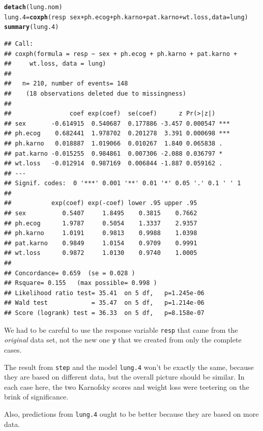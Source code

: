 \documentclass{article}\usepackage[]{graphicx}\usepackage[]{color}
\makeatletter
\newcommand{\hlopt}[1]{\textcolor[rgb]{0,0,0}{#1}}%
\newcommand{\hlstd}[1]{\textcolor[rgb]{0.345,0.345,0.345}{#1}}%
\newcommand{\hlkwb}[1]{\textcolor[rgb]{0.69,0.353,0.396}{#1}}%
\newcommand{\hlkwc}[1]{\textcolor[rgb]{0.333,0.667,0.333}{#1}}%
\newcommand{\hlkwd}[1]{\textcolor[rgb]{0.737,0.353,0.396}{\textbf{#1}}}%
\newenvironment{kframe}{%
 \def\at@end@of@kframe{}%
 \ifinner\ifhmode%
  \def\at@end@of@kframe{\end{minipage}}%
  \begin{minipage}{\columnwidth}%
 \fi\fi%
 \def\FrameCommand##1{\hskip\@totalleftmargin \hskip-\fboxsep
 \colorbox{shadecolor}{##1}\hskip-\fboxsep
     \hskip-\linewidth \hskip-\@totalleftmargin \hskip\columnwidth}%
 \MakeFramed {\advance\hsize-\width
   \@totalleftmargin\z@ \linewidth\hsize
   \@setminipage}}%
 {\par\unskip\endMakeFramed%
 \at@end@of@kframe}
\newenvironment{knitrout}{}{} %
\makeatother
\begin{document}
\begin{knitrout}
\color{fgcolor}\begin{kframe}
\begin{alltt}
\hlkwd{detach}\hlstd{(lung.nom)}
\hlstd{lung.4}\hlkwb{=}\hlkwd{coxph}\hlstd{(resp}\hlopt{~}\hlstd{sex}\hlopt{+}\hlstd{ph.ecog}\hlopt{+}\hlstd{ph.karno}\hlopt{+}\hlstd{pat.karno}\hlopt{+}\hlstd{wt.loss,}\hlkwc{data}\hlstd{=lung)}
\hlkwd{summary}\hlstd{(lung.4)}
\end{alltt}
\begin{verbatim}
## Call:
## coxph(formula = resp ~ sex + ph.ecog + ph.karno + pat.karno + 
##     wt.loss, data = lung)
## 
##   n= 210, number of events= 148 
##    (18 observations deleted due to missingness)
## 
##                coef exp(coef)  se(coef)      z Pr(>|z|)    
## sex       -0.614915  0.540687  0.177886 -3.457 0.000547 ***
## ph.ecog    0.682441  1.978702  0.201278  3.391 0.000698 ***
## ph.karno   0.018887  1.019066  0.010267  1.840 0.065838 .  
## pat.karno -0.015255  0.984861  0.007306 -2.088 0.036797 *  
## wt.loss   -0.012914  0.987169  0.006844 -1.887 0.059162 .  
## ---
## Signif. codes:  0 '***' 0.001 '**' 0.01 '*' 0.05 '.' 0.1 ' ' 1
## 
##           exp(coef) exp(-coef) lower .95 upper .95
## sex          0.5407     1.8495    0.3815    0.7662
## ph.ecog      1.9787     0.5054    1.3337    2.9357
## ph.karno     1.0191     0.9813    0.9988    1.0398
## pat.karno    0.9849     1.0154    0.9709    0.9991
## wt.loss      0.9872     1.0130    0.9740    1.0005
## 
## Concordance= 0.659  (se = 0.028 )
## Rsquare= 0.155   (max possible= 0.998 )
## Likelihood ratio test= 35.41  on 5 df,   p=1.245e-06
## Wald test            = 35.47  on 5 df,   p=1.214e-06
## Score (logrank) test = 36.33  on 5 df,   p=8.158e-07
\end{verbatim}
\end{kframe}
\end{knitrout}

We had to be careful to use the response variable \texttt{resp} that
came from the \emph{original} data set, not the new one \texttt{y}
that we created from only the complete cases.

The result from \texttt{step} and the model \texttt{lung.4} won't be
exactly the same, because they are based on different data, but the
overall picture should be similar. In each case here, the two
Karnofsky scores and weight loss were teetering on the brink of
significance. 

Also, predictions from
\texttt{lung.4} ought to be better because they are based on more data.
\end{document}
